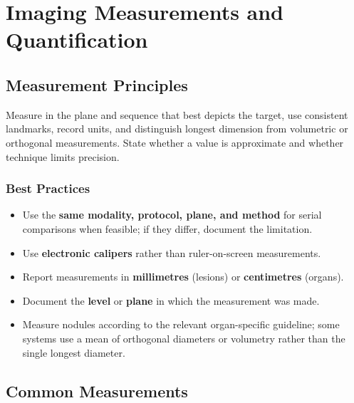 \chapter{Imaging Measurements and Quantification}

\label{ch:ch33_measurements}

\section{Measurement Principles}
Measure in the plane and sequence that best depicts the target, use consistent landmarks, record units, and distinguish longest dimension from volumetric or orthogonal measurements. State whether a value is approximate and whether technique limits precision.

\subsection{Best Practices}
\begin{itemize}
    \item Use the \textbf{same modality, protocol, plane, and method} for serial comparisons when feasible; if they differ, document the limitation.
    \item Use \textbf{electronic calipers} rather than ruler-on-screen measurements.
    \item Report measurements in \textbf{millimetres} (lesions) or \textbf{centimetres} (organs).
    \item Document the \textbf{level} or \textbf{plane} in which the measurement was made.
    \item Measure nodules according to the relevant organ-specific guideline; some systems use a mean of orthogonal diameters or volumetry rather than the single longest diameter.
\end{itemize}

\section{Common Measurements}

